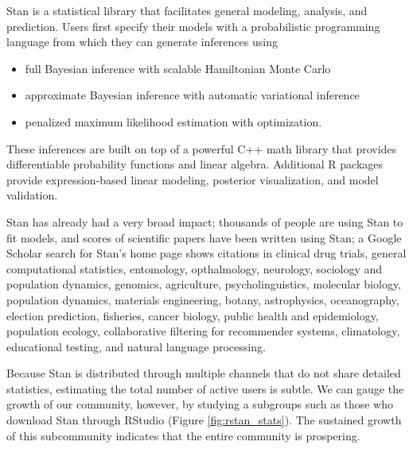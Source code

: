\documentclass[12pt, oneside]{article}
\begin{document}
Stan is a statistical library that facilitates general modeling, analysis, 
and prediction.  Users first specify their models with a probabilistic 
programming language from which they can generate inferences
using

\begin{itemize}
\item full Bayesian inference with scalable Hamiltonian Monte Carlo
\item approximate Bayesian inference with automatic variational inference 
\item penalized maximum likelihood estimation with optimization.
\end{itemize}

These inferences are built on top of a powerful C++ math library that provides 
differentiable probability functions and linear algebra.  Additional R packages 
provide expression-based linear modeling, posterior visualization, and model
validation.

\pagebreak

Stan has already had a very broad impact; thousands of people are using Stan 
to fit models, and scores of scientific papers have been written using Stan; a 
Google Scholar search for Stan's home page shows citations in clinical drug trials, 
general computational statistics, entomology, opthalmology, neurology, sociology 
and population dynamics, genomics, agriculture, psycholinguistics, molecular biology, 
population dynamics, materials engineering, botany, astrophysics, oceanography, 
election prediction, fisheries, cancer biology, public health and epidemiology, population 
ecology, collaborative filtering for recommender systems, climatology, educational 
testing, and natural language processing.

Because Stan is distributed through multiple channels that do not share detailed
statistics, estimating the total number of active users is subtle.  We can gauge the
growth of our community, however, by studying a subgroups such as those who
download Stan through RStudio (Figure \ref{fig:rstan_stats}).  The sustained growth
of this subcommunity indicates that the entire community is prospering.
\end{document}
